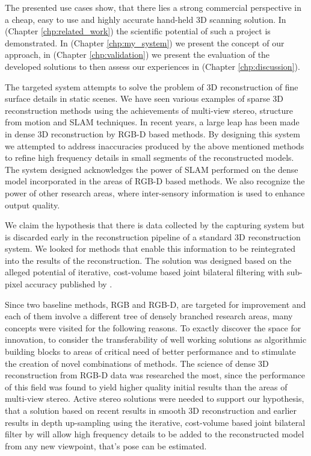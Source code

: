 \documentclass{ucl_thesis}
\newcommand{\chpref}[1]{(Chapter \ref{#1})}
\begin{document}
\par The presented use cases show, that there lies a strong commercial perspective in a cheap, easy to use and highly accurate hand-held 3D scanning solution. In \chpref{chp:related_work} the scientific potential of such a project is demonstrated. In \chpref{chp:my_system} we present the concept of our approach, in \chpref{chp:validation} we present the evaluation of the developed solutions to then assess our experiences in \chpref{chp:discussion}.


\par The targeted system attempts to solve the problem of 3D reconstruction of fine surface details in static scenes. We have seen various examples of sparse 3D reconstruction methods using the achievements of multi-view stereo, structure from motion and SLAM techniques. In recent years, a large leap has been made in dense 3D reconstruction by RGB-D based methods. By designing this system we attempted to address inaccuracies produced by the above mentioned methods to refine high frequency details in small segments of the reconstructed models. The system designed acknowledges the power of SLAM performed on the dense model incorporated in the areas of RGB-D based methods. We also recognize the power of other research areas, where inter-sensory information is used to enhance output quality. 
\par We claim the hypothesis that there is data collected by the capturing system but is discarded early in the reconstruction pipeline of a standard 3D reconstruction system. We looked for methods that enable this information to be reintegrated into the results of the reconstruction. The solution was designed based on the alleged potential of iterative, cost-volume based joint bilateral filtering with sub-pixel accuracy published by \citep{cvpr-07-qingxiong-yang}.

Since two baseline methods, RGB and RGB-D, are targeted for improvement and each of them involve a different tree of densely branched research areas, many concepts were visited for the following reasons. To exactly discover the space for innovation, to consider the transferability of well working solutions as algorithmic building blocks to areas of critical need of better performance and to stimulate the creation of novel combinations of methods. The science of dense 3D reconstruction from RGB-D data was researched the most, since the performance of this field was found to yield higher quality initial results than the areas of multi-view stereo. Active stereo solutions were needed to support our hypothesis, that a solution based on recent results in smooth 3D reconstruction and earlier results in depth up-sampling using the iterative, cost-volume based joint bilateral filter by \cite{cvpr-07-qingxiong-yang} will allow high frequency details to be added to the reconstructed model from any new viewpoint, that's pose can be estimated.
\end{document}
